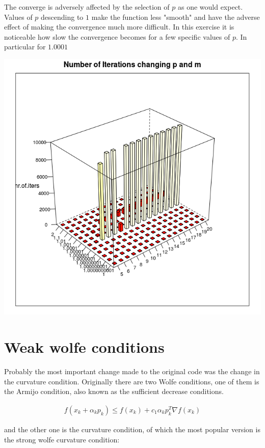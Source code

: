 The converge is adversely affected by the selection of $p$ as one would expect. Values of $p$ descending to $1$ make the function less "smooth" and have the adverse effect of making the convergence much more difficult. In this exercise it is noticeable how slow the convergence becomes for a few specific values of $p$. In particular for $1.0001$

\centering
\includegraphics[scale=0.3]{Figures/hist3dmpniter.png}

\section{Weak wolfe conditions}

Probably the most important change made to the original code was the change in the curvature condition. Originally there are two Wolfe conditions, one of them is the Armijo condition, also known as the sufficient decrease conditions.

\begin{equation}
  \begin{aligned}
    f(x_k + \alpha_kp_k) \leq f(x_k) + c_1 \alpha _k p_k^T\nabla f(x_k)
  \end{aligned}
\end{equation}

and the other one is the curvature condition, of which the most popular version is the strong wolfe curvature condition:

